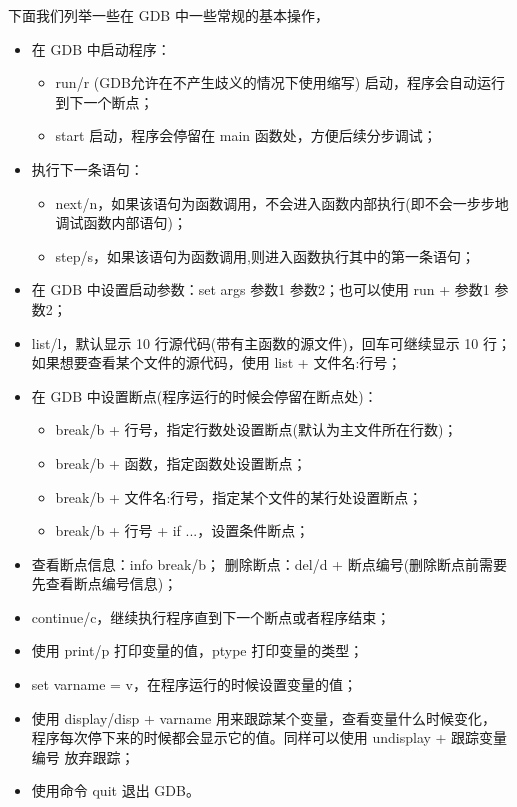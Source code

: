 下面我们列举一些在 GDB 中一些常规的基本操作，
\begin{itemize}
	\item 在 GDB 中启动程序：
	\begin{itemize}
		\item run/r (GDB允许在不产生歧义的情况下使用缩写) 启动，程序会自动运行到下一个断点；
		\item start 启动，程序会停留在 main 函数处，方便后续分步调试；
	\end{itemize}
	\item 执行下一条语句：
	\begin{itemize}
		\item next/n，如果该语句为函数调用，不会进入函数内部执行(即不会一步步地调试函数内部语句)；
		\item step/s，如果该语句为函数调用,则进入函数执行其中的第一条语句；
	\end{itemize}
	\item 在 GDB 中设置启动参数：set args 参数1 参数2；也可以使用 run + 参数1 参数2；
	\item list/l，默认显示 10 行源代码(带有主函数的源文件)，回车可继续显示 10 行；
		如果想要查看某个文件的源代码，使用 list + 文件名:行号；
	\item 在 GDB 中设置断点(程序运行的时候会停留在断点处)：
	\begin{itemize}
		\item break/b + 行号，指定行数处设置断点(默认为主文件所在行数)；
		\item break/b + 函数，指定函数处设置断点；
		\item break/b + 文件名:行号，指定某个文件的某行处设置断点；
		\item break/b + 行号 + if ...，设置条件断点；
	\end{itemize}
	\item 查看断点信息：info break/b；
		删除断点：del/d + 断点编号(删除断点前需要先查看断点编号信息)；
	\item continue/c，继续执行程序直到下一个断点或者程序结束；
	\item 使用 print/p 打印变量的值，ptype 打印变量的类型；
	\item set varname = v，在程序运行的时候设置变量的值；
	\item 使用 display/disp + varname 用来跟踪某个变量，查看变量什么时候变化，
		程序每次停下来的时候都会显示它的值。同样可以使用 undisplay + 跟踪变量编号 放弃跟踪；
	\item 使用命令 quit 退出 GDB。
\end{itemize}

